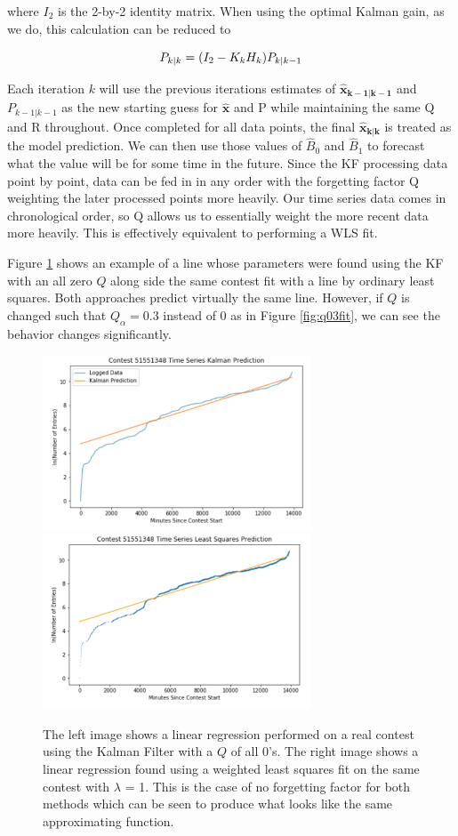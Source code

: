 where $I_{2}$ is the 2-by-2 identity matrix. When using the optimal Kalman gain, as we do, this calculation can be reduced to 

\begin{equation} 
\centering
P_{k|k} = (I_{2} - K_{k}H_{k})P_{k|k-1}
\end{equation}

Each iteration $k$ will use the previous iterations estimates of $\bm{\hat{x}_{k-1|k-1}}$ and $P_{k-1|k-1}$ as the new starting guess for $\bm{\hat{x}}$ and P while maintaining the same Q and R throughout. Once completed for all data points, the final $\bm{\hat{x}_{k|k}}$ is treated as the model prediction. We can then use those values of $\hat{B}_{0}$ and $\hat{B}_{1}$ to forecast what the value will be for some time in the future. Since the KF processing data point by point, data can be fed in in any order with the forgetting factor Q weighting the later processed points more heavily. Our time series data comes in chronological order, so Q allows us to essentially weight the more recent data more heavily. This is effectively equivalent to performing a WLS fit.

Figure \ref{fig:kflsfit} shows an example of a line whose parameters were found using the KF with an all zero $Q$ along side the same contest fit with a line by ordinary least squares. Both approaches predict virtually the same line. However, if $Q$ is changed such that $Q_{\alpha} = 0.3$ instead of 0 as in Figure \ref{fig:q03fit}, we can see the behavior changes significantly.

\begin{figure}[h]
\centering
\includegraphics[width=8cm]{body/methodology/KF_Q0.png}
\includegraphics[width=8cm]{body/methodology/LS_pred.png}
\caption{The left image shows a linear regression performed on a real contest using the Kalman Filter with a $Q$ of all 0's. The right image shows a linear regression found using a weighted least squares fit on the same contest with $\lambda$ = 1. This is the case of no forgetting factor for both methods which can be seen to produce what looks like the same approximating function.}
\label{fig:kflsfit}
\end{figure}

